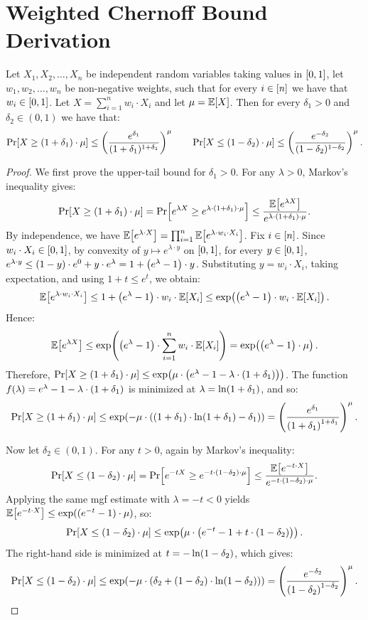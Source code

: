 \section{Weighted Chernoff Bound Derivation} \label{sec:appendix}


\begin{theorem}
    Let $X_1, X_2, \dots, X_n$ be independent random variables taking values in $\sbr{0,1}$, let $w_1, w_2, \dots, w_n$ be non-negative weights, such that for every $i\in \sbr{n}$ we have that $w_i\in \sbr{0,1}$. Let $X=\sum_{i=1}^{n} w_i\cdot X_i$ and let $\mu = \E{X}$. Then for every $\delta_1 > 0$ and $\delta_2 \in (0,1)$ we have that:
    \[
        \Pr\sbr{X \geq (1+\delta_1)\cdot \mu} \leq \br{\frac{e^{\delta_1}}{(1+\delta_1)^{1+\delta_1}}}^\mu
        \qquad
        \Pr\sbr{X \leq (1-\delta_2)\cdot \mu} \leq \br{\frac{e^{-\delta_2}}{(1-\delta_2)^{1-\delta_2}}}^\mu.
    \]
\end{theorem}


\begin{proof}
We first prove the upper-tail bound for $\delta_1>0$. For any $\lambda>0$, Markov's inequality gives:
\[
\Pr\sbr{X \ge \br{1+\delta_1}\cdot\mu}
= \Pr\sbr{e^{\lambda X} \ge e^{\lambda\cdot\br{1+\delta_1}\cdot\mu}} \le \frac{\E{e^{\lambda X}}}{e^{\lambda\cdot\br{1+\delta_1}\cdot\mu}}.
\]
By independence, we have $
\E{e^{\lambda \cdot X}}
= \prod_{i=1}^n \E{e^{\lambda\cdot w_i\cdot X_i}}$.
Fix $i\in\sbr{n}$. Since $w_i\cdot X_i\in\sbr{0,1}$, by convexity of $y\mapsto e^{\lambda \cdot y}$ on $\sbr{0,1}$, for every $y\in\sbr{0,1}$,
$e^{\lambda \cdot y}
\le \br{1-y}\cdot e^0 + y\cdot e^{\lambda}
= 1 + \br{e^{\lambda}-1}\cdot y$.
Substituting $y=w_i\cdot X_i$, taking expectation, and using $1+t\le e^t$, we obtain:
\[
\E{e^{\lambda\cdot w_i\cdot X_i}}
\le 1 + \br{e^{\lambda}-1}\cdot w_i\cdot\E{X_i} \le \exp\br{\br{e^{\lambda}-1}\cdot w_i\cdot\E{X_i}}.
\]
Hence:
\[
\E{e^{\lambda X}}
\le \exp\br{\br{e^{\lambda}-1}\cdot\sum_{i=1}^n w_i\cdot\E{X_i}} = \exp\br{\br{e^{\lambda}-1}\cdot\mu}.
\]
Therefore,
$\Pr\sbr{X \ge \br{1+\delta_1}\cdot\mu}
\le \exp\br{\mu\cdot\br{e^{\lambda}-1-\lambda\cdot\br{1+\delta_1}}}$.
The function $f\br{\lambda}=e^{\lambda}-1-\lambda\cdot \br{1+\delta_1}$ is minimized at $\lambda=\ln\br{1+\delta_1}$, and so:
\[
\Pr\sbr{X \ge \br{1+\delta_1}\cdot\mu}
\le \exp\br{-\mu\cdot\br{\br{1+\delta_1}\cdot\ln\br{1+\delta_1}-\delta_1}} = \br{\frac{e^{\delta_1}}{\br{1+\delta_1}^{1+\delta_1}}}^{\mu}.
\]

Now let $\delta_2\in(0,1)$. For any $t>0$, again by Markov's inequality:
\[
\Pr\sbr{X \le \br{1-\delta_2}\cdot\mu}
= \Pr\sbr{e^{-tX} \ge e^{-t\cdot\br{1-\delta_2}\cdot\mu}} \le \frac{\E{e^{-t\cdot X}}}{e^{-t\cdot\br{1-\delta_2}\cdot\mu}}.
\]
Applying the same mgf estimate with $\lambda=-t<0$ yields $
\E{e^{-t\cdot X}}
\le \exp\br{\br{e^{-t}-1}\cdot\mu}$,
so:
\[
\Pr\sbr{X \le \br{1-\delta_2}\cdot\mu}
\le \exp\br{\mu\cdot\br{e^{-t}-1+t\cdot\br{1-\delta_2}}}.
\]
The right-hand side is minimized at $t=-\ln\br{1-\delta_2}$, which gives:
\[
\Pr\sbr{X \le \br{1-\delta_2}\cdot\mu}
\le \exp\br{-\mu\cdot\br{\delta_2+\br{1-\delta_2}\cdot\ln\br{1-\delta_2}}} = \br{\frac{e^{-\delta_2}}{\br{1-\delta_2}^{1-\delta_2}}}^{\mu}.
\]
\end{proof}


